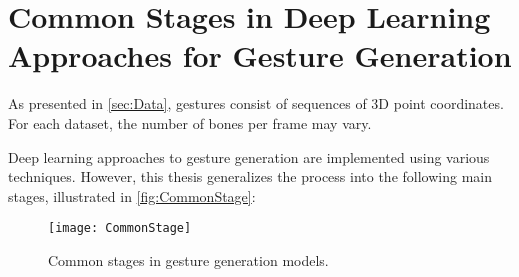 \section{Common Stages in Deep Learning Approaches for Gesture Generation}
\label{sec:commonstage}

As presented in \autoref{sec:Data}, gestures consist of sequences of 3D point coordinates. For each dataset, the number of bones per frame may vary.

Deep learning approaches to gesture generation are implemented using various techniques. However, this thesis generalizes the process into the following main stages, illustrated in \autoref{fig:CommonStage}:

\begin{figure}[H]
	\centering
	\texttt{[image: CommonStage]}
	\caption{Common stages in gesture generation models.}
	\label{fig:CommonStage}
\end{figure}

